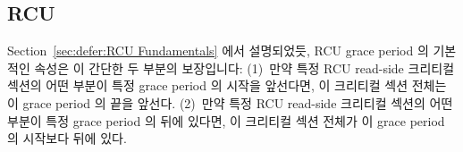 






\subsection{RCU}
\label{sec:memorder:RCU}

Section~\ref{sec:defer:RCU Fundamentals} 에서 설명되었듯, RCU grace period 의
기본적인 속성은 이 간단한 두 부분의 보장입니다:
(1)~만약 특정 RCU read-side 크리티컬 섹션의 어떤 부분이 특정 grace period 의
시작을 앞선다면, 이 크리티컬 섹션 전체는 이 grace period 의 끝을 앞선다.
(2)~만약 특정 RCU read-side 크리티컬 섹션의 어떤 부분이 특정 grace period 의
뒤에 있다면, 이 크리티컬 섹션 전체가 이 grace period 의 시작보다 뒤에 있다.

